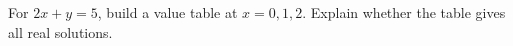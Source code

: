 For $2x+y=5$, build a value table at $x=0,1,2$. Explain whether the table gives all real solutions.
